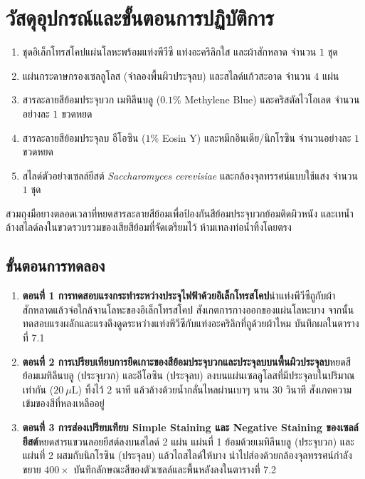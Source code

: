 \section{วัสดุอุปกรณ์และขั้นตอนการปฏิบัติการ}

\begin{equipbox}
\begin{enumerate}
    \item ชุดอิเล็กโทรสโคปแผ่นโลหะพร้อมแท่งพีวีซี แท่งอะคริลิกใส และผ้าสักหลาด จำนวน $1$ ชุด
    \item แผ่นกระดาษกรองเซลลูโลส (จำลองพื้นผิวประจุลบ) และสไลด์แก้วสะอาด จำนวน $4$ แผ่น
    \item สารละลายสีย้อมประจุบวก เมทิลีนบลู ($0.1\%$ Methylene Blue) และคริสตัลไวโอเลต จำนวนอย่างละ $1$ ขวดหยด
    \item สารละลายสีย้อมประจุลบ อีโอซิน ($1\%$ Eosin Y) และหมึกอินเดีย/นิกโรซิน จำนวนอย่างละ $1$ ขวดหยด
    \item สไลด์ตัวอย่างเซลล์ยีสต์ \textit{Saccharomyces cerevisiae} และกล้องจุลทรรศน์แบบใช้แสง จำนวน $1$ ชุด
\end{enumerate}
\end{equipbox}

\begin{warningbox}
สวมถุงมือยางตลอดเวลาที่หยดสารละลายสีย้อมเพื่อป้องกันสีย้อมประจุบวกย้อมติดผิวหนัง และเทน้ำล้างสไลด์ลงในขวดรวบรวมของเสียสีย้อมที่จัดเตรียมไว้ ห้ามเทลงท่อน้ำทิ้งโดยตรง
\end{warningbox}

\subsection{ขั้นตอนการทดลอง}
\begin{enumerate}
    \item \textbf{ตอนที่ 1 การทดสอบแรงกระทำระหว่างประจุไฟฟ้าด้วยอิเล็กโทรสโคป}\quad นำแท่งพีวีซีถูกับผ้าสักหลาดแล้วจ่อใกล้จานโลหะของอิเล็กโทรสโคป สังเกตการกางออกของแผ่นโลหะบาง จากนั้นทดสอบแรงผลักและแรงดึงดูดระหว่างแท่งพีวีซีกับแท่งอะคริลิกที่ถูด้วยผ้าไหม บันทึกผลใน\mbox{ตารางที่} 7.1
    \item \textbf{ตอนที่ 2 การเปรียบเทียบการยึดเกาะของสีย้อมประจุบวกและประจุลบบนพื้นผิวประจุลบ}\quad หยดสีย้อมเมทิลีนบลู (ประจุบวก) และอีโอซิน (ประจุลบ) ลงบนแผ่นเซลลูโลสที่มีประจุลบในปริมาณเท่ากัน ($20\ \mu\text{L}$) ทิ้งไว้ $2$ นาที แล้วล้างด้วยน้ำกลั่นไหลผ่านเบาๆ นาน $30$ วินาที สังเกตความเข้มของสีที่หลงเหลืออยู่
    \item \textbf{ตอนที่ 3 การส่องเปรียบเทียบ Simple Staining และ Negative Staining ของเซลล์ยีสต์}\quad หยดสารแขวนลอยยีสต์ลงบนสไลด์ 2 แผ่น แผ่นที่ 1 ย้อมด้วยเมทิลีนบลู (ประจุบวก) และแผ่นที่ 2 ผสมกับนิกโรซิน (ประจุลบ) แล้วไถสไลด์ให้บาง นำไปส่องด้วยกล้องจุลทรรศน์กำลังขยาย $400\times$ บันทึกลักษณะสีของตัวเซลล์และพื้นหลังลงใน\mbox{ตารางที่} 7.2
\end{enumerate}

